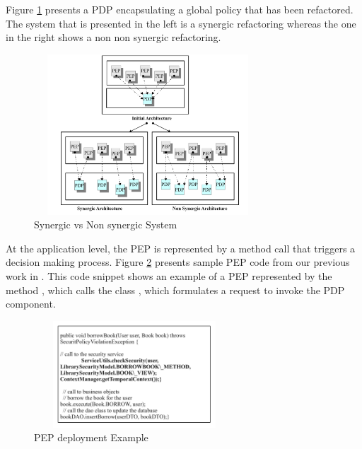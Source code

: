 Figure \ref{Synergicvsnonsynergicarchitecture} presents a PDP encapsulating a global policy that has been refactored. The system that is 
presented in the left is a synergic refactoring whereas the one in the right shows a non non synergic refactoring.
\begin{figure}[!h]
\begin{center}
\includegraphics[width=8.5cm, height=6cm]{synergic-nonsynergic}
\caption{Synergic vs Non synergic System}
\label{Synergicvsnonsynergicarchitecture}
\end{center}
\end{figure}

At the application level, the PEP is represented by a method call that triggers a decision making process.
Figure \ref{PEPdeploymentexample} presents sample PEP code from our previous work in \cite{legacy}. This code snippet
 shows an example of a PEP 
represented by the method , which calls the class 
, which formulates a request to invoke the PDP component.

\begin{figure}[!h]
\begin{center}
\includegraphics[width=7.5cm, height=4cm]{PEPExample}
\caption{PEP deployment Example}
\label{PEPdeploymentexample}
\end{center}
\end{figure}

